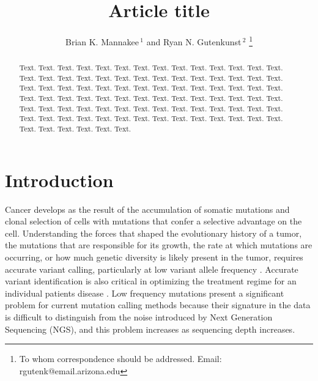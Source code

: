 \documentclass[a4,center,fleqn]{NAR}
\begin{document}
\title{Article title}

\author{%
Brian K. Mannakee\,$^{1}$ and
Ryan N. Gutenkunst\,$^{2}$%
\footnote{To whom correspondence should be addressed.
Email: rgutenk@email.arizona.edu}}

\address{%
$^{1}$University of Arizona Mel and Enid Zuckerman College of Public Health
and
$^{2}$University of Arizona Department of Molecular and Cellular Biology}


\maketitle

\begin{abstract}
Text. Text. Text. Text. Text. Text. Text. Text. Text. Text. Text.
Text. Text. Text. Text. Text. Text. Text. Text. Text. Text. Text.
Text. Text. Text. Text. Text. Text. Text. Text. Text. Text. Text.
Text. Text. Text. Text. Text. Text. Text. Text. Text. Text. Text.
Text. Text. Text. Text. Text. Text. Text. Text. Text. Text. Text.
Text. Text. Text. Text. Text. Text. Text. Text. Text. Text. Text.
Text. Text. Text. Text. Text. Text. Text. Text. Text. Text. Text.
Text. Text. Text. Text. Text. Text. Text. Text. Text. Text. Text.
Text. Text.
\end{abstract}


\section{Introduction}

Cancer develops as the result of the accumulation of somatic mutations and clonal selection of cells with mutations that confer a selective advantage on the cell.
Understanding the forces that shaped the evolutionary history of a tumor, the mutations that are responsible for its growth, the rate at which mutations are occurring, or how much genetic diversity is likely present in the tumor, requires accurate variant calling, particularly at low variant allele frequency \cite{Williams2016,Bozic2016,Williams2018}.
Accurate variant identification is also critical in optimizing the treatment regime for an individual patients disease \citep{Ding2012,Mardis2012,Chen2013,Borad2014,Findlay2016}.
Low frequency mutations present a significant problem for current mutation calling methods because their signature in the data is difficult to distinguish from the noise introduced by Next Generation Sequencing (NGS), and this problem increases as sequencing depth increases.
\end{document}
